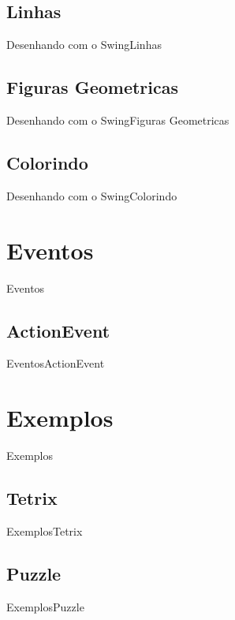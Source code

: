 \documentclass[10pt]{beamer}
\begin{document}
\subsection{Linhas}
\begin{frame}{Desenhando com o Swing}{Linhas}
\end{frame}{}
\subsection{Figuras Geometricas}
\begin{frame}{Desenhando com o Swing}{Figuras Geometricas}
\end{frame}{}
\subsection{Colorindo}
\begin{frame}{Desenhando com o Swing}{Colorindo}
\end{frame}{}
\section{Eventos}
\begin{frame}{Eventos}{}
\end{frame}{}
\subsection{ActionEvent}
\begin{frame}{Eventos}{ActionEvent}
\end{frame}{}
\section{Exemplos}
\begin{frame}{Exemplos}{}
\end{frame}{}
\subsection{Tetrix}
\begin{frame}{Exemplos}{Tetrix}
\end{frame}{}
\subsection{Puzzle}
\begin{frame}{Exemplos}{Puzzle}
\end{frame}{}
\end{document}
